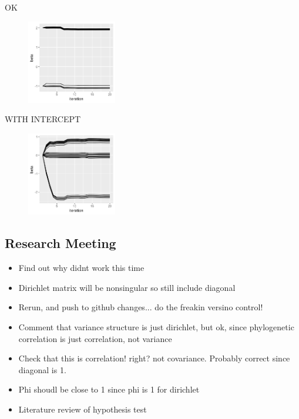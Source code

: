 \documentclass[10pt]{article}
\theoremstyle{definition}
\begin{document}
OK
\begin{figure}[!htb]
	\centering
	\includegraphics[width=0.35\textwidth]{img/Temp_week_journal-5e490a3d.png}
	\caption{}
	\label{}
\end{figure}


WITH INTERCEPT
\begin{figure}[!htb]
	\centering
	\includegraphics[width=0.35\textwidth]{img/Temp_week_journal-f796f9af.png}
	\caption{}
	\label{}
\end{figure}

\subsection{Research Meeting}

\begin{itemize}
  \item Find out why didnt work this time
  \item Dirichlet matrix will be nonsingular so still include diagonal
  \item Rerun, and push to github changes... do the freakin versino control!
  \item Comment that variance structure is just dirichlet, but ok, since phylogenetic correlation is just correlation, not variance
  \item Check that this is correlation! right? not covariance. Probably correct since diagonal is 1.
  \item Phi shoudl be close to 1 since phi is 1 for dirichlet
  \item Literature review of hypothesis test
\end{itemize}
\end{document}
